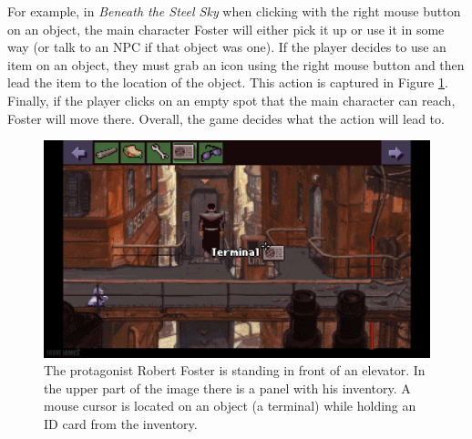 For example, in \textit{Beneath the Steel Sky} when clicking with the right mouse button on an object, the main character Foster will either pick it up or use it in some way (or talk to an NPC if that object was one). If the player decides to use an item on an object, they must grab an icon using the right mouse button and then lead the item to the location of the object. This action is captured in Figure \ref{fig:C-BaSS}. Finally, if the player clicks on an empty spot that the main character can reach, Foster will move there. Overall, the game decides what the action will lead to.

\begin{figure}[H]
\centering
\includegraphics[width=1.\linewidth]{img/BaSS.png}
\caption{The protagonist Robert Foster is standing in front of an elevator. In the upper part of the image there is a panel with his inventory. A mouse cursor is located on an object (a terminal) while holding an ID card from the inventory.}
\label{fig:C-BaSS}
\end{figure}

